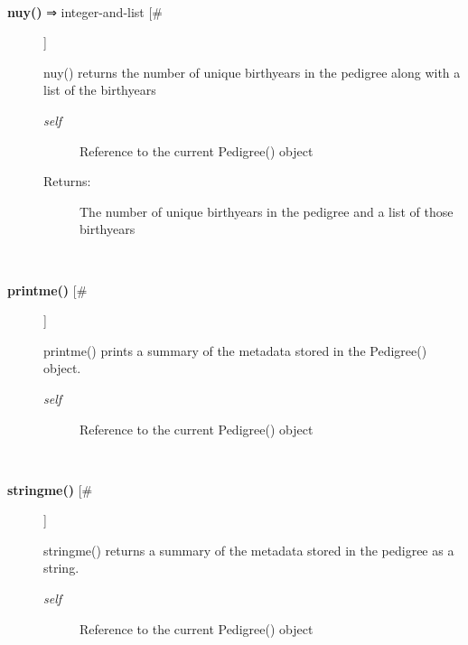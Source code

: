 \documentclass[10pt]{article}
\begin{document}
\begin{description}
\begin{description}
\end{description}
\\ 

\item[\textbf{nuy()}
 ⇒ integer-and-list [\#]]

 nuy() returns the number of unique birthyears in the pedigree along with a list of the birthyears
\begin{description}
\item[\emph{self}
] Reference to the current Pedigree() object
\item[Returns:] The number of unique birthyears in the pedigree and a list of those birthyears

\end{description}
\\ 

\item[\textbf{printme()}
 [\#]]

 printme() prints a summary of the metadata stored in the Pedigree() object.
\begin{description}
\item[\emph{self}
] Reference to the current Pedigree() object

\end{description}
\\ 

\item[\textbf{stringme()}
 [\#]]

 stringme() returns a summary of the metadata stored in the pedigree as a string.
\begin{description}
\item[\emph{self}
] Reference to the current Pedigree() object

\end{description}
\\ 


\end{description}
\end{document}
